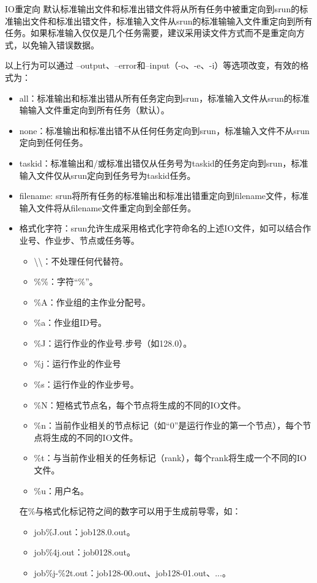 \begin{frame}{IO重定向}
默认标准输出文件和标准出错文件将从所有任务中被重定向到srun的标准输出文件和标准出错文件，标准输入文件从srun的标准输输入文件重定向到所有任务。如果标准输入仅仅是几个任务需要，建议采用读文件方式而不是重定向方式，以免输入错误数据。

以上行为可以通过 --output、--error和--input（-o、-e、-i）等选项改变，有效的格式为：
\begin{itemize}
	\item all：标准输出和标准出错从所有任务定向到srun，标准输入文件从srun的标准输输入文件重定向到所有任务（默认）。
    \item none：标准输出和标准出错不从任何任务定向到srun，标准输入文件不从srun定向到任何任务。
    \item taskid：标准输出和/或标准出错仅从任务号为taskid的任务定向到srun，标准输入文件仅从srun定向到任务号为taskid任务。
    \item filename: srun将所有任务的标准输出和标准出错重定向到filename文件，标准输入文件将从filename文件重定向到全部任务。
    \item 格式化字符：srun允许生成采用格式化字符命名的上述IO文件，如可以结合作业号、作业步、节点或任务等。
\begin{itemize}
	\item \textbackslash\textbackslash：不处理任何代替符。
    \item \%\%：字符``\%''。
    \item \%A：作业组的主作业分配号。
    \item \%a：作业组ID号。
    \item \%J：运行作业的作业号.步号（如128.0）。
    \item \%j：运行作业的作业号
    \item \%s：运行作业的作业步号。
    \item \%N：短格式节点名，每个节点将生成的不同的IO文件。
    \item \%n：当前作业相关的节点标记（如``0''是运行作业的第一个节点），每个节点将生成的不同的IO文件。
    \item \%t：与当前作业相关的任务标记（rank），每个rank将生成一个不同的IO文件。
    \item \%u：用户名。
\end{itemize}
在\%与格式化标记符之间的数字可以用于生成前导零，如：
\begin{itemize}
   \item job\%J.out：job128.0.out。
   \item job\%4j.out：job0128.out。
   \item job\%j-\%2t.out：job128-00.out、job128-01.out、...。
\end{itemize}
\end{itemize}
\end{frame}

